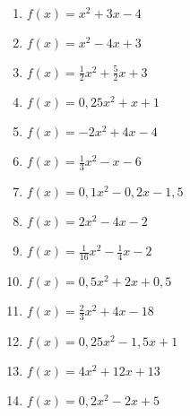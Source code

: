 \begin{Exercise}[title={Bestimme die Nullstellen}, label=normalformNullstellenA1]\\
	\begin{minipage}{\textwidth}
		\begin{minipage}{0.49\textwidth}
			\begin{enumerate}[label=\alph*)]
				\item \(f(x)=x^2+3x-4\)
				\item \(f(x)=x^2-4x+3\)
				\item \(f(x)=\frac{1}{2}x^2+\frac{5}{2}x+3\)
				\item \(f(x)=0,25x^2+x+1\)
				\item \(f(x)=-2x^2+4x-4\)
				\item \(f(x)=\frac{1}{3}x^2-x-6\)
				\item \(f(x)=0,1x^2-0,2x-1,5\)
			\end{enumerate}
		\end{minipage}
		\begin{minipage}{0.49\textwidth}
			\begin{enumerate}[label=\alph*)]
				\setcounter{enumi}{7}
				\item \(f(x)=2x^2-4x-2\)
				\item \(f(x)=\frac{1}{16}x^2-\frac{1}{4}x-2\)
				\item \(f(x)=0,5x^2+2x+0,5\)
				\item \(f(x)=\frac{2}{3}x^2+4x-18\)
				\item \(f(x)=0,25x^2-1,5x+1\)
				\item \(f(x)=4x^2+12x+13\)
				\item \(f(x)=0,2x^2-2x+5\)
			\end{enumerate}
		\end{minipage}
	\end{minipage}
\end{Exercise}

